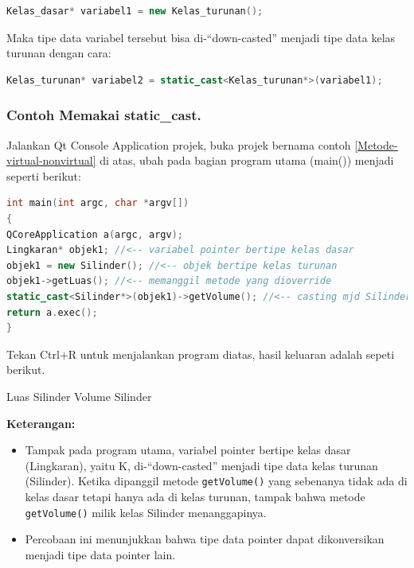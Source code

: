 \begin{lstlisting}[language=c++, numbers=none]
Kelas_dasar* variabel1 = new Kelas_turunan();
\end{lstlisting}

Maka tipe data variabel tersebut bisa di-``down-casted'' menjadi tipe
data kelas turunan dengan cara:

\begin{lstlisting}[language=c++, numbers=none]
Kelas_turunan* variabel2 = static_cast<Kelas_turunan*>(variabel1);
\end{lstlisting}

\subsubsection*{Contoh  Memakai static\_cast.}

Jalankan Qt Console Application projek, buka projek bernama contoh \ref{Metode-virtual-nonvirtual} di
atas, ubah pada bagian program utama (main()) menjadi seperti berikut:

\begin{lstlisting}[language=c++, caption=Memakai static\_cast]
int main(int argc, char *argv[])
{
QCoreApplication a(argc, argv);
Lingkaran* objek1; //<-- variabel pointer bertipe kelas dasar
objek1 = new Silinder(); //<-- objek bertipe kelas turunan
objek1->getLuas(); //<-- memanggil metode yang dioverride
static_cast<Silinder*>(objek1)->getVolume(); //<-- casting mjd Silinder
return a.exec();
}
\end{lstlisting}

Tekan Ctrl+R untuk menjalankan program diatas, hasil keluaran adalah
sepeti berikut.

\begin{lcverbatim}
Luas Silinder
Volume Silinder
\end{lcverbatim}

\textbf{Keterangan:}

\begin{itemize}

\item
  Tampak pada program utama, variabel pointer bertipe kelas dasar
  (Lingkaran), yaitu K, di-``down-casted'' menjadi tipe data kelas
  turunan (Silinder). Ketika dipanggil metode \texttt{getVolume()} yang
  sebenanya tidak ada di kelas dasar tetapi hanya ada di kelas turunan,
  tampak bahwa metode \texttt{getVolume()} milik kelas Silinder
  menanggapinya.
\item
  Percobaan ini menunjukkan bahwa tipe data pointer dapat dikonversikan
  menjadi tipe data pointer lain.
\end{itemize}

